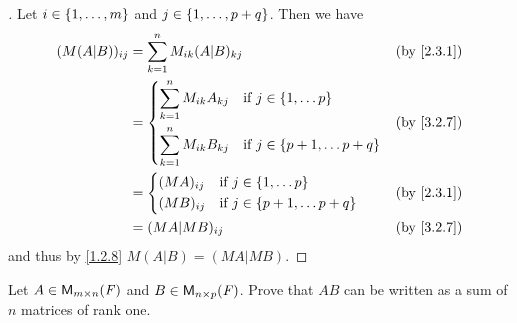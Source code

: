 \begin{proof}[]
  Let \(i \in \left\lbrace1, \dots, m\right\rbrace\) and \(j \in \left\lbrace1, \dots, p + q\right\rbrace\).
  Then we have
  \begin{align*}
    (M (A | B))_{i j} & = \sum_{k = 1}^n M_{i k} (A | B)_{k j}                                        &  & \text{(by \cref{2.3.1})} \\
                      & = \begin{dcases}
                            \sum_{k = 1}^n M_{i k} A_{k j} & \text{if } j \in \set{1, \dots p}         \\
                            \sum_{k = 1}^n M_{i k} B_{k j} & \text{if } j \in \set{p + 1, \dots p + q}
                          \end{dcases} &  & \text{(by \cref{3.2.7})}                                \\
                      & = \begin{dcases}
                            (MA)_{i j} & \text{if } j \in \set{1, \dots p}         \\
                            (MB)_{i j} & \text{if } j \in \set{p + 1, \dots p + q}
                          \end{dcases}                     &  & \text{(by \cref{2.3.1})}                                            \\
                      & = (MA | MB)_{i j}                                                             &  & \text{(by \cref{3.2.7})}
  \end{align*}
  and thus by \cref{1.2.8} \(M (A | B) = (MA | MB)\).
\end{proof}

\setcounter{ex}{17}
\begin{ex}\label{ex:3.2.18}
  Let \(A \in \mathsf{M}_{{m} \times n}({\mathit{F}})\) and \(B \in \mathsf{M}_{{n} \times p}({\mathit{F}})\).
  Prove that \(AB\) can be written as a sum of \(n\) matrices of rank one.
\end{ex}

